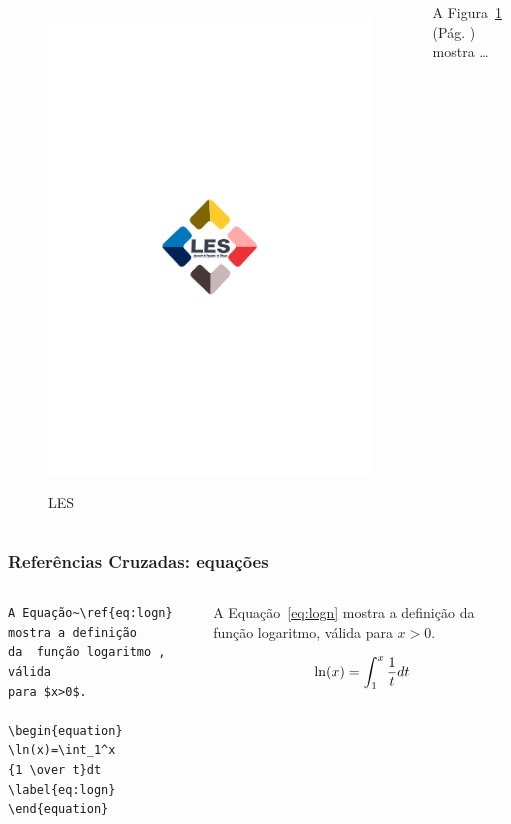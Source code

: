 \begin{frame}[fragile]
{\begin{columns}
\begin{figure}
\centering
\includegraphics[scale=.3]{../img/les.pdf}
\label{fig:les}
\caption{LES }
\end{figure}
A Figura~\ref{fig:les} 
(Pág. \pageref{fig:les})
 mostra \ldots
\end{columns}
}
\end{frame}

\begin{frame}[fragile]
\frametitle{Referências Cruzadas: equações}
{\scriptsize
\begin{columns}
\begin{verbatim}
A Equação~\ref{eq:logn} mostra a definição
da  função logaritmo , válida
para $x>0$.

\begin{equation}
\ln(x)=\int_1^x
{1 \over t}dt
\label{eq:logn}
\end{equation}
\end{verbatim}

\begin{framed}
A Equação~\ref{eq:logn} mostra
a definição da função logaritmo,
válida para $x>0$.

\begin{equation}
\ln(x)=\int_1^x
{1 \over t}dt
\label{eq:logn}
\end{equation}
\end{framed}
\end{columns}
 }
\end{frame}

